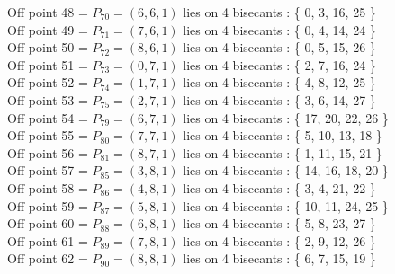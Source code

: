 Off point 48 = $P_{70} = ( 6, 6, 1 )$ lies on 4 bisecants : \{ 0, 3, 16, 25 \}\\
Off point 49 = $P_{71} = ( 7, 6, 1 )$ lies on 4 bisecants : \{ 0, 4, 14, 24 \}\\
Off point 50 = $P_{72} = ( 8, 6, 1 )$ lies on 4 bisecants : \{ 0, 5, 15, 26 \}\\
Off point 51 = $P_{73} = ( 0, 7, 1 )$ lies on 4 bisecants : \{ 2, 7, 16, 24 \}\\
Off point 52 = $P_{74} = ( 1, 7, 1 )$ lies on 4 bisecants : \{ 4, 8, 12, 25 \}\\
Off point 53 = $P_{75} = ( 2, 7, 1 )$ lies on 4 bisecants : \{ 3, 6, 14, 27 \}\\
Off point 54 = $P_{79} = ( 6, 7, 1 )$ lies on 4 bisecants : \{ 17, 20, 22, 26 \}\\
Off point 55 = $P_{80} = ( 7, 7, 1 )$ lies on 4 bisecants : \{ 5, 10, 13, 18 \}\\
Off point 56 = $P_{81} = ( 8, 7, 1 )$ lies on 4 bisecants : \{ 1, 11, 15, 21 \}\\
Off point 57 = $P_{85} = ( 3, 8, 1 )$ lies on 4 bisecants : \{ 14, 16, 18, 20 \}\\
Off point 58 = $P_{86} = ( 4, 8, 1 )$ lies on 4 bisecants : \{ 3, 4, 21, 22 \}\\
Off point 59 = $P_{87} = ( 5, 8, 1 )$ lies on 4 bisecants : \{ 10, 11, 24, 25 \}\\
Off point 60 = $P_{88} = ( 6, 8, 1 )$ lies on 4 bisecants : \{ 5, 8, 23, 27 \}\\
Off point 61 = $P_{89} = ( 7, 8, 1 )$ lies on 4 bisecants : \{ 2, 9, 12, 26 \}\\
Off point 62 = $P_{90} = ( 8, 8, 1 )$ lies on 4 bisecants : \{ 6, 7, 15, 19 \}\\
